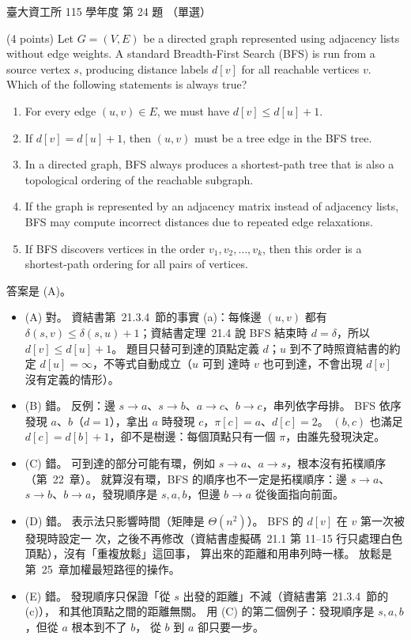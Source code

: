 \begin{pastexam}[label={px:ntu-115-dsa-24}]{臺大資工所 115 學年度 第 24 題}
（單選）

(4 points) Let $G=(V,E)$ be a directed graph represented using adjacency lists without edge weights. A standard Breadth-First Search (BFS) is run from a source vertex $s$, producing distance labels $d[v]$ for all reachable vertices $v$. Which of the following statements is always true?
\begin{enumerate}[label=(\Alph*)]
\item For every edge $(u,v)\in E$, we must have $d[v]\le d[u]+1$.
\item If $d[v]=d[u]+1$, then $(u,v)$ must be a tree edge in the BFS tree.
\item In a directed graph, BFS always produces a shortest-path tree that is also a topological ordering of the reachable subgraph.
\item If the graph is represented by an adjacency matrix instead of adjacency lists, BFS may compute incorrect distances due to repeated edge relaxations.
\item If BFS discovers vertices in the order $v_1,v_2,\ldots,v_k$, then this order is a shortest-path ordering for all pairs of vertices.
\end{enumerate}
\end{pastexam}

\begin{pastsoln}
答案是 (A)。
\begin{itemize}
\item (A) 對。 資結書第~21.3.4~節的事實 (a)：每條邊 $(u, v)$ 都有 $\delta(s, v) \le
\delta(s, u) + 1$；資結書定理~21.4 說 BFS 結束時 $d = \delta$，所以 $d[v] \le d[u] + 1$。
題目只替可到達的頂點定義 $d$；$u$ 到不了時照資結書的約定 $d[u] = \infty$，不等式自動成立（$u$ 可到
達時 $v$ 也可到達，不會出現 $d[v]$ 沒有定義的情形）。
\item (B) 錯。 反例：邊 $s \to a$、$s \to b$、$a \to c$、$b \to c$，串列依字母排。 BFS 依序發現
$a$、$b$（$d = 1$），拿出 $a$ 時發現 $c$，$\pi[c] = a$、$d[c] = 2$。 $(b, c)$ 也滿足 $d[c] =
d[b] + 1$，卻不是樹邊：每個頂點只有一個 $\pi$，由誰先發現決定。
\item (C) 錯。 可到達的部分可能有環，例如 $s \to a$、$a \to s$，根本沒有拓樸順序（第~22~章）。
就算沒有環，BFS 的順序也不一定是拓樸順序：邊 $s \to a$、$s \to b$、$b \to a$，發現順序是
$s, a, b$，但邊 $b \to a$ 從後面指向前面。
\item (D) 錯。 表示法只影響時間（矩陣是 $\Theta(n^2)$）。 BFS 的 $d[v]$ 在 $v$ 第一次被發現時設定一
次，之後不再修改（資結書虛擬碼~21.1 第 11--15 行只處理白色頂點），沒有「重複放鬆」這回事，
算出來的距離和用串列時一樣。 放鬆是第~25~章加權最短路徑的操作。
\item (E) 錯。 發現順序只保證「從 $s$ 出發的距離」不減（資結書第~21.3.4~節的 (c)），
和其他頂點之間的距離無關。 用 (C) 的第二個例子：發現順序是 $s, a, b$，但從 $a$ 根本到不了 $b$，
從 $b$ 到 $a$ 卻只要一步。
\end{itemize}
\end{pastsoln}
